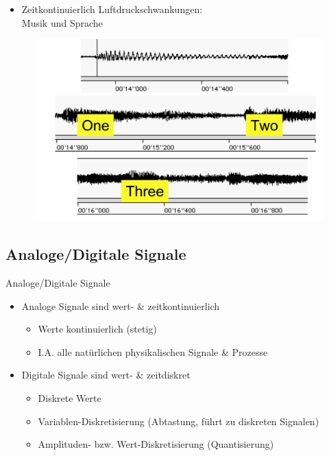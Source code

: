 \documentclass[xcolor=dvipsnames,aspectratio=169]{beamer}
\begin{document}
\begin{frame}
	\begin{itemize}
		\item Zeitkontinuierlich Luftdruckschwankungen:\\Musik und Sprache
	\end{itemize}
	\begin{figure}
	\centering
	\includegraphics[scale=0.5]{audio}
	\end{figure}
\end{frame}


\subsection{Analoge/Digitale Signale}
\begin{frame}{Analoge/Digitale Signale}
\begin{itemize}
	\item Analoge Signale sind wert- \& zeitkontinuierlich
	\begin{itemize}
		\item Werte kontinuierlich (stetig)
		\item I.A. alle natürlichen physikalischen Signale \& Prozesse
	\end{itemize}
	\item Digitale Signale sind wert- \& zeitdiskret
	\begin{itemize}
		\item Diskrete Werte
		\item Variablen-Diskretisierung (Abtastung, führt zu diskreten Signalen)
		\item Amplituden- bzw. Wert-Diskretisierung (Quantisierung)
	\end{itemize}	
\end{itemize}
\end{frame}
\end{document}
